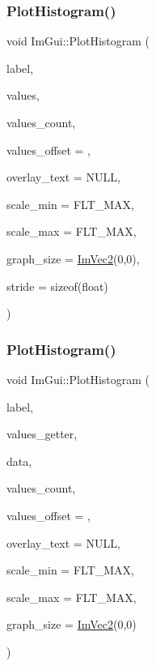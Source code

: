 \subsubsection{\texorpdfstring{Plot\+Histogram()}{PlotHistogram()}\hspace{0.1cm}{\footnotesize\ttfamily [1/2]}}
{\footnotesize\ttfamily void Im\+Gui\+::\+Plot\+Histogram (\begin{DoxyParamCaption}\item[{const char $\ast$}]{label,  }\item[{const float $\ast$}]{values,  }\item[{int}]{values\+\_\+count,  }\item[{int}]{values\+\_\+offset = {},  }\item[{const char $\ast$}]{overlay\+\_\+text = {\ttfamily NULL},  }\item[{float}]{scale\+\_\+min = {\ttfamily FLT\+\_\+MAX},  }\item[{float}]{scale\+\_\+max = {\ttfamily FLT\+\_\+MAX},  }\item[{\hyperlink{struct_im_vec2}{Im\+Vec2}}]{graph\+\_\+size = {\ttfamily \hyperlink{struct_im_vec2}{Im\+Vec2}(0,0)},  }\item[{int}]{stride = {\ttfamily sizeof(float)} }\end{DoxyParamCaption})}

\hypertarget{namespace_im_gui_af8089203baf8cf723a158c9e34bda2a4}{}\label{namespace_im_gui_af8089203baf8cf723a158c9e34bda2a4} 
\subsubsection{\texorpdfstring{Plot\+Histogram()}{PlotHistogram()}\hspace{0.1cm}{\footnotesize\ttfamily [2/2]}}
{\footnotesize\ttfamily void Im\+Gui\+::\+Plot\+Histogram (\begin{DoxyParamCaption}\item[{const char $\ast$}]{label,  }\item[{float($\ast$)(void $\ast$data, int idx)}]{values\+\_\+getter,  }\item[{void $\ast$}]{data,  }\item[{int}]{values\+\_\+count,  }\item[{int}]{values\+\_\+offset = {},  }\item[{const char $\ast$}]{overlay\+\_\+text = {\ttfamily NULL},  }\item[{float}]{scale\+\_\+min = {\ttfamily FLT\+\_\+MAX},  }\item[{float}]{scale\+\_\+max = {\ttfamily FLT\+\_\+MAX},  }\item[{\hyperlink{struct_im_vec2}{Im\+Vec2}}]{graph\+\_\+size = {\ttfamily \hyperlink{struct_im_vec2}{Im\+Vec2}(0,0)} }\end{DoxyParamCaption})}

